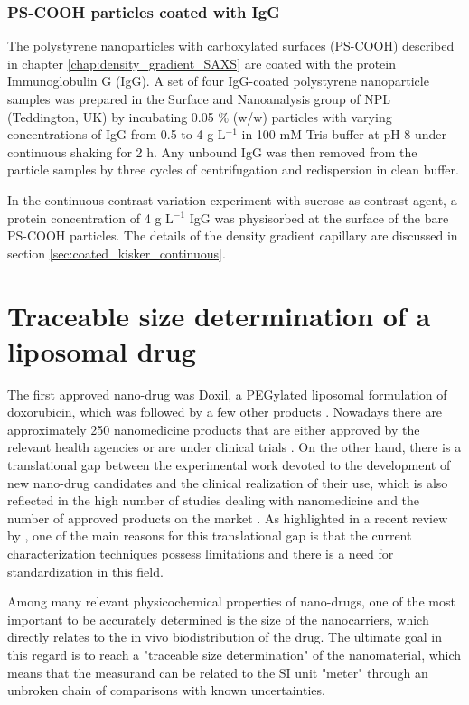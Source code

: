 \subsubsection{PS-COOH particles coated with IgG}

The polystyrene nanoparticles with carboxylated surfaces (PS-COOH) described in chapter \ref{chap:density_gradient_SAXS} are coated with the protein Immunoglobulin G (IgG). A set of four IgG-coated polystyrene nanoparticle samples was prepared in the Surface and Nanoanalysis group of NPL (Teddington, UK) by incubating 0.05 $\%$ (w/w) particles with varying concentrations of IgG from 0.5 to 4 g L$^{-1}$ in 100 mM Tris buffer at pH 8 under continuous shaking for 2 h. Any unbound IgG was then removed from the particle samples by three cycles of centrifugation and redispersion in clean buffer.

In the continuous contrast variation experiment with sucrose as contrast agent, a protein concentration of 4 g L$^{-1}$ IgG was physisorbed at the surface of the bare PS-COOH particles. The details of the density gradient capillary are discussed in section \ref{sec:coated_kisker_continuous}.


\section{Traceable size determination of a liposomal drug}
\label{sec:caelyx_size}

The first approved nano-drug was Doxil, a PEGylated liposomal formulation of doxorubicin, which was followed by a few other products \citep{yeh_clinical_2011,barenholz_doxil_2012}. Nowadays there are approximately 250 nanomedicine products that are either approved by the relevant health agencies or are under clinical trials \citep{etheridge_big_2013}. On the other hand, there is a translational gap between the experimental work devoted to the development of new nano-drug candidates and the clinical realization of their use, which is also reflected in the high number of studies dealing with nanomedicine and the number of approved products on the market \citep{khorasani_closing_2014, venditto_cancer_2013}. As highlighted in a recent review by \cite{khorasani_closing_2014}, one of the main reasons for this translational gap is that the current characterization techniques possess limitations and there is a need for standardization in this field.

Among many relevant physicochemical properties of nano-drugs, one of the most important to be accurately determined is the size of the nanocarriers, which directly relates to the in vivo biodistribution of the drug. The ultimate goal in this regard is to reach a "traceable size determination" of the nanomaterial, which means that the measurand can be related to the SI unit "meter" through an unbroken chain of comparisons with known uncertainties. 

